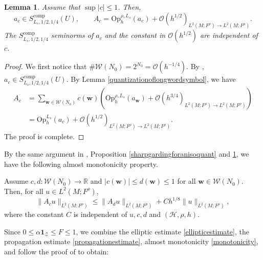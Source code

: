 \documentclass[11pt,oneside,reqno]{amsart}
\newtheorem{lemma}[theorem]{Lemma}
\theoremstyle{definition}
\numberwithin{equation}{section}
\theoremstyle{plain}
\begin{document}
\begin{lemma}\label{pseudoofweighted}
Assume that $\sup |c| \leq 1$. Then,
\begin{equation*}
    a_c \in S_{L_s,1/2,1/4}^{\mathrm{comp}}(U), \qquad A_c=\mathrm{Op}_h^{\rho, L_s}(a_c)+\mathcal{O}(h^{1 / 2})_{L^2(M;F^\rho) \rightarrow L^2(M;F^\rho)} .
\end{equation*}
The $S_{L_s, 1 / 2,1 / 4}^{\mathrm{comp}}$ seminorms of $a_c$ and the constant in $\mathcal{O}(h^{1 / 2})$ are independent of $c$.
\end{lemma}

\begin{proof}
We first notice that $\# \mathcal{W}(N_0)=2^{N_0}=\mathcal{O}(h^{-1/4})$. By \cite[Lemma 4.4]{dyatlov2018semiclassical}, $a_c \in S_{L_s,1/2,1/4}^{\mathrm{comp}}(U) $. By Lemma \ref{quantizationoflongwordsymbol}, we have
\begin{equation*}
\begin{aligned}
    A_c&=\sum_{\mathbf{w} \in \mathcal{W}(N_0)} c(\mathbf{w})\left(\mathrm{Op}_h^{\rho,L_s}(a_{\mathbf{w}})+\mathcal{O}(h^{3 / 4})_{L^2(M;F^\rho) \rightarrow L^2(M;F^\rho)}\right) \\
    &=\mathrm{Op}_h^{L_s}(a_c)+\mathcal{O}(h^{1 / 2})_{L^2(M;F^\rho) \rightarrow L^2(M;F^\rho)}.
\end{aligned}
\end{equation*}
The proof is complete.
\end{proof}


By the same argument in \cite[Lemma 4.5]{dyatlov2018semiclassical}, Proposition \ref{sharpgardingforanisoquant} and \ref{pseudoofweighted}, we have the following almost monotonicity property.

Assume $c, d: \mathcal{W}(N_0) \rightarrow \mathbb{R}$ and $|c(\mathbf{w})| \leq d(\mathbf{w}) \leq 1$ for all $\mathbf{w} \in \mathcal{W}(N_0)$. Then, for all $u \in L^2(M;F^{\rho})$, 
\begin{equation}\label{monotonicity}
 \|A_c u \|_{L^2(M;F^\rho)} \leq \|A_d u \|_{L^2(M;F^\rho)}+C h^{1 / 8}\|u\|_{L^2(M;F^\rho)} ,
\end{equation}
where the constant $C$ is independent of $u,c, d$ and $(\mathcal{H},\rho,h)$.

Since $0 \leq \alpha \mathbf{1}_{\mathcal{Z}} \leq F \leq 1$, we combine the elliptic estimate \eqref{ellipticestimate}, the propagation estimate \eqref{propagationestimate}, almost monotonicity \eqref{monotonicity}, and follow the proof of \cite[Lemma 4.6]{dyatlov2018semiclassical} to obtain:
\end{document}
